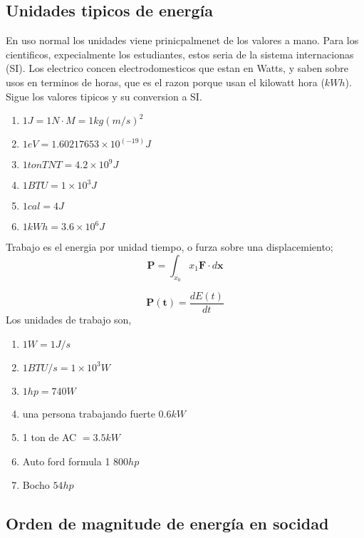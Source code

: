 {\subsection{Unidades tipicos de energ\'ia}

En uso normal los unidades viene prinicpalmenet de los valores a mano. Para los cientificos, expecialmente los estudiantes, estos seria de la sistema internacionas (SI). Los electrico concen electrodomesticos que estan en Watts, y saben sobre usos en terminos de horas, que es el razon porque usan el kilowatt hora ($kWh$). Sigue los valores tipicos y su conversion a SI.

\begin{enumerate}
	\item $1J=1N\cdot M=1 kg (m/s)^2$
	\item $1eV=1.60217653 \times 10^(-19)J $
	\item $1 ton TNT=4.2 \times 10^9 J$
	\item $1 BTU=1 \times 10^3 J$
	\item $1 cal=4J$
	\item $1 kWh=3.6 \times 10^6 J$
\end{enumerate}

Trabajo es el energia por unidad tiempo, o furza sobre una displacemiento;
\begin{equation}
	\boldsymbol{P}=\int_{x_0}{x_1} \boldsymbol{F} \cdot d\boldsymbol{x}
\end{equation}

\begin{equation}
	\boldsymbol{P(t)}=\frac {d E(t)} {d t}
\end{equation}
 Los unidades de trabajo son, 
 
 \begin{enumerate}
 	\item $1W=1J/s$
 	\item $1BTU/s=1 \times 10^3 W$
 	\item $1 hp=740W$
 	\item una persona trabajando fuerte $0.6 kW$
 	\item 1 ton de AC $=3.5 kW$
 	\item Auto ford formula 1 $800 hp$
 	\item Bocho $54 hp$
 \end{enumerate}


\subsection{Orden de magnitude de energ\'ia en socidad}

}
